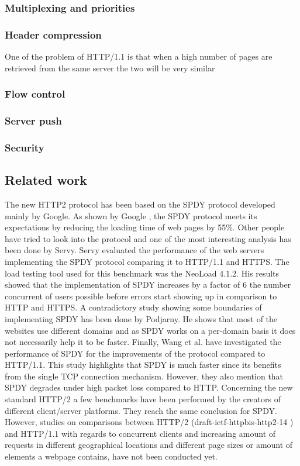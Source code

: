 \subsubsection{Multiplexing and priorities}
\subsubsection{Header compression}
One of the problem of HTTP/1.1 is that when a high number of pages are retrieved from the same server the two will be very similar
\subsubsection{Flow control}
\subsubsection{Server push}
\subsubsection{Security}

\subsection{Related work}
The new HTTP2 protocol has been based on the SPDY protocol developed mainly by Google. As shown by Google \cite{google2x}, the SPDY protocol meets its expectations by reducing the loading time of web pages by 55\%. Other people have tried to look into the protocol and one of the most interesting analysis has been done by Servy\cite{servy}. Servy evaluated the performance of the web servers implementing the SPDY protocol comparing it to HTTP/1.1 and HTTPS. The load testing tool used for this benchmark was the NeoLoad 4.1.2. His results showed that the implementation of SPDY increases by a factor of 6 the number concurrent of users possible before errors start showing up in comparison to HTTP and HTTPS. 
A contradictory study showing some boundaries of implementing SPDY has been done by Podjarny\cite{podiatry}. He shows that most of the websites use different domains and as SPDY works on a per-domain basis it does not necessarily help it to be faster. Finally, Wang et al.\cite{wang} have investigated the performance of SPDY for the improvements of the protocol compared to HTTP/1.1. This study highlights that SPDY is much faster since its benefits from the single TCP connection mechanism. However, they also mention that SPDY degrades under high packet loss compared to HTTP. 
Concerning the new standard HTTP/2 a few benchmarks have been performed by the creators of different client/server platforms. They reach the same conclusion for SPDY. \\
However, studies on comparisons between HTTP/2 (draft-ietf-httpbis-http2-14 \cite{h2c-14} ) and HTTP/1.1 with regards to concurrent clients and increasing amount of requests in different geographical locations and different page sizes or amount of elements a webpage contains, have not been conducted yet.